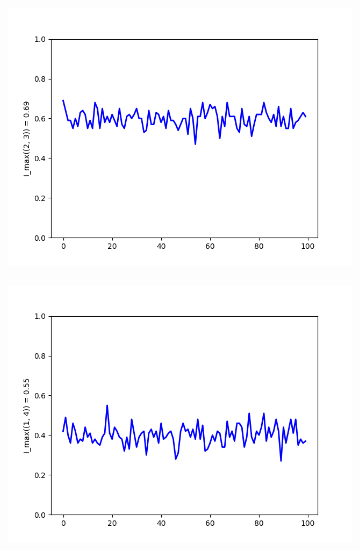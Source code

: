 \documentclass{llncs}
\begin{document}
\begin{figure}

\begin{subfigure}{0.5\linewidth}
\centering\includegraphics[scale=0.4]{images/2-3-max-consistent-partitions.png}\hfill
\end{subfigure}
\begin{subfigure}{0.5\linewidth}
\centering\includegraphics[scale=0.4]{images/1-4-max-consistent-partitions.png}
\end{subfigure}
\end{figure}
\end{document}
